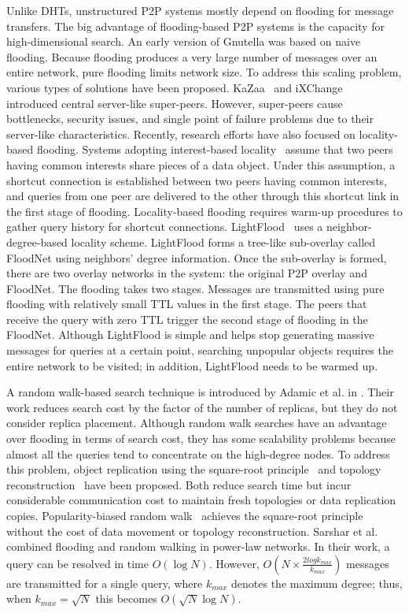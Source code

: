 \documentclass[9.5pt,journal,final,finalsubmission,twocolumn]{IEEEtran}
\begin{document}
Unlike DHTs, unstructured P2P systems mostly depend on flooding 
for message transfers. The big advantage of flooding-based P2P systems 
is the capacity for high-dimensional search.
An early version of Gnutella was based on naive
flooding. Because flooding produces a very large number of
messages over an entire 
network, pure flooding limits network size. 
To address this scaling problem, various types of solutions have been 
proposed. KaZaa~\cite{kazaa} and iXChange~\cite{JohnstoneSM05} 
introduced central server-like super-peers. 
However, super-peers cause bottlenecks, security issues, and single 
point of failure problems due to their server-like characteristics. 
Recently, research efforts have also focused on locality-based flooding. Systems 
adopting interest-based locality~\cite{Guo04,Guo05,SMZ03} assume that 
two peers having common interests share pieces of a data object. 
Under this assumption, a shortcut 
connection is established between two peers having common interests, 
and queries from one peer are delivered to the other through this 
shortcut link in the first stage of flooding. 
Locality-based flooding requires warm-up procedures to gather query 
history for shortcut connections. 
LightFlood~\cite{JiangGZW08} uses 
a neighbor-degree-based locality scheme. 
LightFlood forms a tree-like sub-overlay called 
FloodNet using neighbors' degree information. Once the sub-overlay 
is formed, there are two overlay networks in the system: the original 
P2P overlay and FloodNet. The flooding takes two stages.
Messages are transmitted using pure flooding with relatively small TTL values 
in the first stage. The peers that receive the query with zero TTL trigger 
the second stage of flooding in the FloodNet. Although 
LightFlood is simple and helps stop generating massive messages 
for queries at a certain point, searching unpopular objects requires  
the entire network to be visited; in addition, LightFlood needs to 
be warmed up.  

A random walk-based search technique is introduced by Adamic et al. 
in \cite{alph:powerlaw01}. 
Their work reduces search cost by the factor of the number of replicas, 
but they do not consider replica placement. 
Although random walk searches have an advantage over flooding
in terms of search cost, they has some
scalability problems because almost all the queries tend to concentrate
on the high-degree nodes. To address this problem, object
replication using the square-root principle~\cite{CohenS02,LCKS02}
and topology reconstruction~\cite{Cooper05} have been proposed. 
Both reduce search time but incur considerable communication cost 
to maintain fresh topologies or data replication copies. 
Popularity-biased random walk~\cite{zs:popularity06}
achieves the square-root principle without the cost of data movement or
topology reconstruction. Sarshar et al. \cite{ns:percolation}
combined flooding and random walking in power-law networks. In their
work, a query can be resolved in time $O(\log N)$. However,
$O(N\times \frac{2log k_{max}}{k_{max}})$ messages are
transmitted for a single query, where $k_{max}$ denotes the maximum
degree; thus, when $k_{max} = \sqrt{N}$ this becomes $O(\sqrt N \log N)$.
\end{document}
